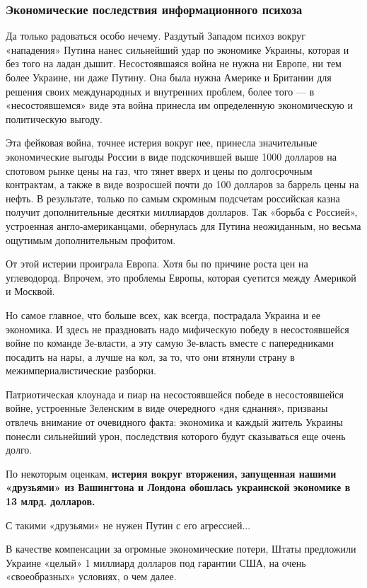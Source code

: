  
 
 
 
 

\subsubsection{Экономические последствия информационного психоза}
\label{sec:17_02_2022.stz.news.ua.fraza.1.kak_zapadnyje_partnery_opuskajut_ukrainu.1.ekonomika_posledstvia}

Да только радоваться особо нечему. Раздутый Западом психоз вокруг «нападения»
Путина нанес сильнейший удар по экономике Украины, которая и без того на ладан
дышит. Несостоявшаяся война не нужна ни Европе, ни тем более Украине, ни даже
Путину. Она была нужна Америке и Британии для решения своих международных и
внутренних проблем, более того — в «несостоявшемся» виде эта война принесла им
определенную экономическую и политическую выгоду.

Эта фейковая война, точнее истерия вокруг нее, принесла значительные
экономические выгоды России в виде подскочившей выше 1000 долларов на спотовом
рынке цены на газ, что тянет вверх и цены по долгосрочным контрактам, а также в
виде возросшей почти до 100 долларов за баррель цены на нефть. В результате,
только по самым скромным подсчетам российская казна получит дополнительные
десятки миллиардов долларов. Так «борьба с Россией», устроенная
англо-американцами, обернулась для Путина неожиданным, но весьма ощутимым
дополнительным профитом.

От этой истерии проиграла Европа. Хотя бы по причине роста цен на углеводород.
Впрочем, это проблемы Европы, которая суетится между Америкой и Москвой.

Но самое главное, что больше всех, как всегда, пострадала Украина и ее
экономика. И здесь не праздновать надо мифическую победу в несостоявшейся войне
по команде Зе-власти, а эту самую Зе-власть вместе с папередниками посадить на
нары, а лучше на кол, за то, что они втянули страну в межимпериалистические
разборки.

Патриотическая клоунада и пиар на несостоявшейся победе в несостоявшейся войне,
устроенные Зеленским в виде очередного «дня єднання», призваны отвлечь внимание
от очевидного факта: экономика и каждый житель Украины понесли сильнейший урон,
последствия которого будут сказываться еще очень долго.

По некоторым оценкам, \textbf{истерия вокруг вторжения, запущенная нашими «друзьями» из
Вашингтона и Лондона обошлась украинской экономике в 13 млрд. долларов.}

С такими «друзьями» не нужен Путин с его агрессией...

В качестве компенсации за огромные экономические потери, Штаты предложили
Украине «целый» 1 миллиард долларов под гарантии США, на очень «своеобразных»
условиях, о чем далее.

